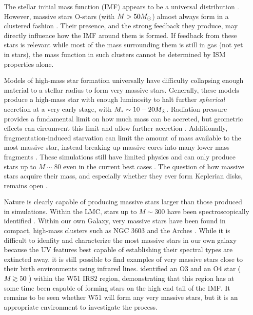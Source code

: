 \documentclass{aa}
\begin{document}
The stellar initial mass function (IMF) appears to be a universal distribution
\citep{Bastian2010a}.  However, massive stars O-stars (with $M>50 M_{\odot}$)
almost always form in a clustered fashion \citep[in proto-clusters or
proto-associations][]{de-Wit2004a,de-Wit2005a,Parker2007a}. %
Their presence, and the strong feedback they produce, may directly influence
how the IMF around them is formed.  If feedback from these stars is relevant
while most of the  mass surrounding them is still in gas (not yet in stars),
the mass function in such clusters cannot be determined by ISM properties
alone. 

Models of high-mass star formation universally have difficulty collapsing enough
material to a stellar radius to form very massive stars.  Generally, these models
produce a high-mass star with enough luminosity to halt further
\emph{spherical} accretion at a very early stage, with $M_* \sim 10-20M_{\odot}$.
Radiation pressure provides a fundamental limit on how much mass can be
accreted, but geometric effects can circumvent this limit and allow
further accretion
\citep{Yorke2002a,Krumholz2005b,Krumholz2009a,Krumholz2009b,Kuiper2012a,Kuiper2013c,Rosen2016a}.
Additionally, fragmentation-induced starvation can limit the amount of mass
available to the most massive star, instead breaking up massive cores into many
lower-mass fragments \citep{Peters2010a}.  These simulations still have limited
physics and can only produce stars up to $M\sim80$ \msun even in the current
best cases \citep{Kuiper2015a,Kuiper2016a}.  The question of how massive stars
acquire their mass, and especially whether they ever form Keplerian disks,
remains open \citep{Beltran2016b}.

Nature is clearly capable of producing massive stars larger than those produced
in simulations.  Within the LMC, stars up to $M\sim300$ \msun have been
spectroscopically identified \citep{Crowther2016a}.  Within our own Galaxy,
very massive stars have been found in compact, high-mass clusters such as NGC
3603 and the Arches \citep{Crowther2010a}.  While it is difficult to idenfity
and characterize the most massive stars in our own galaxy because the UV
features best capable of establishing their spectral types are extincted away,
it is still possible to find examples of very massive stars close to their
birth environments using infrared lines.  \citet{Barbosa2008a} identified an O3
and an O4 star ($M\gtrsim50$ \msun) within the W51 IRS2 region, demonstrating
that this region has at some time been capable of forming stars on the high
end tail of the IMF.  It remains to be seen whether W51 will form any very
massive stars, but it is  an appropriate environment to investigate
the process.
\end{document}
